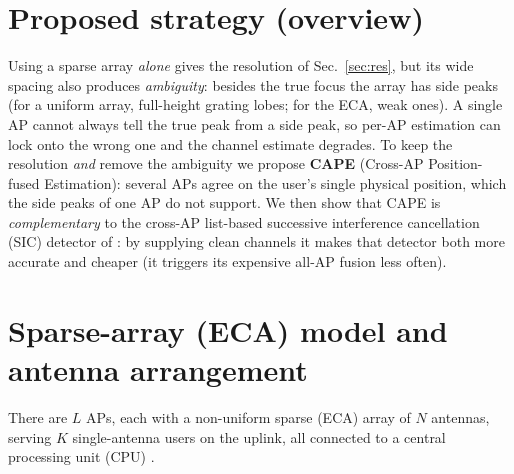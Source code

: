 \documentclass[11pt]{article}
\begin{document}
\section{Proposed strategy (overview)}
Using a sparse array \emph{alone} gives the resolution of Sec.~\ref{sec:res}, but its wide spacing
also produces \emph{ambiguity}: besides the true focus the array has side peaks (for a uniform array,
full-height grating lobes; for the ECA, weak ones). A single AP cannot always tell the true peak from
a side peak, so per-AP estimation can lock onto the wrong one and the channel estimate degrades. To
keep the resolution \emph{and} remove the ambiguity we propose \textbf{CAPE} (Cross-AP Position-fused
Estimation): several APs agree on the user's single physical position, which the side peaks of one AP
do not support. We then show that CAPE is \emph{complementary} to the cross-AP list-based successive
interference cancellation (SIC) detector of \cite{haider2026icassp,haider2026vtc}: by supplying clean
channels it makes that detector both more accurate and cheaper (it triggers its expensive all-AP
fusion less often).

\section{Sparse-array (ECA) model and antenna arrangement}
There are $L$ APs, each with a non-uniform sparse (ECA) array of $N$ antennas, serving $K$
single-antenna users on the uplink, all connected to a central processing unit (CPU)
\cite{ngo2017cellfree,bjornson2020scalable}.
\end{document}
